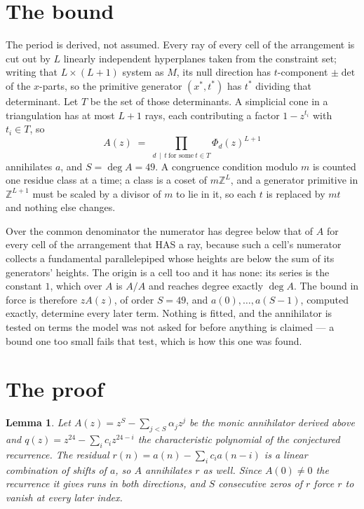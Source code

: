 \documentclass[11pt,a4paper]{article}
\theoremstyle{plain}
\newtheorem{lemma}[theorem]{Lemma}
\theoremstyle{definition}
\begin{document}
\section{The bound}

The period is derived, not assumed. Every ray of every cell of the arrangement is cut out by
$L$ linearly independent hyperplanes taken from the constraint set; writing that $L\times(L+1)$
system as $M$, its null direction has $t$-component $\pm\det$ of the $x$-parts, so the
primitive generator $(x^*,t^*)$ has $t^*$ dividing that determinant. Let $T$ be the set of
those determinants. A simplicial cone in a triangulation has at most $L+1$ rays, each
contributing a factor $1-z^{t_i}$ with $t_i\in T$, so
\[
A(z)\;=\;\prod_{d\,\mid\,t\ \text{for some}\ t\in T}\Phi_d(z)^{L+1}
\]
annihilates $a$, and $S=\deg A=49$. A congruence condition modulo $m$ is counted one residue
class at a time; a class is a coset of $m\mathbb{Z}^L$, and a generator primitive in
$\mathbb{Z}^{L+1}$ must be scaled by a divisor of $m$ to lie in it, so each $t$ is replaced
by $mt$ and nothing else changes.

Over the common denominator the numerator has degree below that of $A$ for every cell of the
arrangement that HAS a ray, because such a cell's numerator collects a fundamental
parallelepiped whose heights are below the sum of its generators' heights. The origin is a cell
too and it has none: its series is the constant $1$, which over $A$ is $A/A$ and reaches degree
exactly $\deg A$. The bound in force is therefore $zA(z)$, of order $S=49$, and
$a(0),\dots,a(S-1)$, computed exactly, determine every later term. Nothing is fitted, and the
annihilator is tested on terms the model was not asked for before anything is claimed --- a
bound one too small fails that test, which is how this one was found.

\section{The proof}

\begin{lemma}\label{lem:crit}
Let $A(z)=z^S-\sum_{j<S}\alpha_jz^{j}$ be the monic annihilator derived above and
$q(z)=z^{24}-\sum_ic_iz^{24-i}$ the characteristic polynomial of the conjectured
recurrence. The residual $r(n)=a(n)-\sum_ic_ia(n-i)$ is a linear combination of shifts of $a$,
so $A$ annihilates $r$ as well. Since $A(0)\ne0$ the recurrence it gives runs in both
directions, and $S$ consecutive zeros of $r$ force $r$ to vanish at every later index.
\end{lemma}
\end{document}
